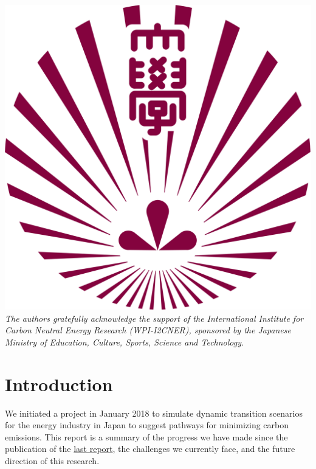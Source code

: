 \documentclass[14pt,a4paper]{article} %
\begin{document}
\begin{titlepage}
    \includegraphics[scale=0.04]{ku_logo}\\[1cm] %
     

    \textit{The authors gratefully acknowledge the support of the International Institute for Carbon
Neutral Energy Research (WPI-I2CNER), sponsored by the Japanese Ministry of Education, Culture, Sports, Science and Technology.}  

\end{titlepage}

\section{Introduction}
We initiated a project in January 2018 to simulate dynamic transition scenarios for the energy industry in Japan to suggest pathways for minimizing carbon emissions. This report is a summary of the progress we have made since the publication of the \href{https://github.com/arfc/i2cner/tree/master/doc/2018-09-report}{last report}, the challenges we currently face, and the future direction of this research. \\
\end{document}

